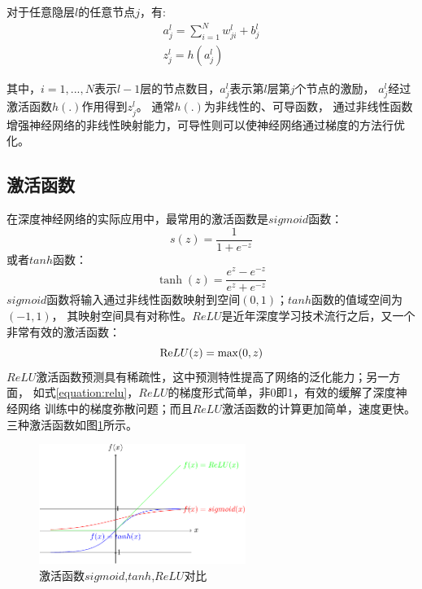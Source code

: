 对于任意隐层$l$的任意节点$j$，有:
\[\begin{array}{l}
a_j^l = \sum\limits_{i = 1}^N {w_{ji}^l + b_j^l} \\
z_j^l = h(a_j^l)
\end{array}\]

其中，$i = 1,...,N$表示$l-1$层的节点数目，$a_j^l$表示第$l$层第$j$个节点的激励，
$a_j^l$经过激活函数$h(.)$作用得到$z_j^l$。
通常$h(.)$为非线性的、可导函数，
通过非线性函数增强神经网络的非线性映射能力，可导性则可以使神经网络通过梯度的方法行优化。

\subsection{激活函数}

在深度神经网络的实际应用中，最常用的激活函数是$sigmoid$函数：
\begin{equation}
s(z) = \frac{1}{{1 + {e^{ - z}}}}
\end{equation}
或者$tanh$函数：
\begin{equation}
\tanh (z) = \frac{{{e^z} - {e^{ - z}}}}{{{e^z} + {e^{ - z}}}}
\end{equation}
$sigmoid$函数将输入通过非线性函数映射到空间$(0,1)$；$tanh$函数的值域空间为$(-1,1)$，
其映射空间具有对称性。$ReLU$是近年深度学习技术流行之后，又一个非常有效的激活函数：
\begin{equation} \label{equation:relu}
{\mathop{\rm Re}\nolimits} LU(z) = \max (0,z)
\end{equation}
$ReLU$激活函数预测具有稀疏性，这中预测特性提高了网络的泛化能力；另一方面，
如式\ref{equation:relu}，$ReLU$的梯度形式简单，非0即1，有效的缓解了深度神经网络
训练中的梯度弥散问题；而且$ReLU$激活函数的计算更加简单，速度更快。
三种激活函数如图\ref{fig:activation}所示。

\begin{figure}
\centering
\includegraphics[width=0.6\textwidth]{figures/chapter3/activation-crop}
\caption{激活函数$sigmoid$,$tanh$,$ReLU$对比}
\label{fig:activation}
\end{figure}

